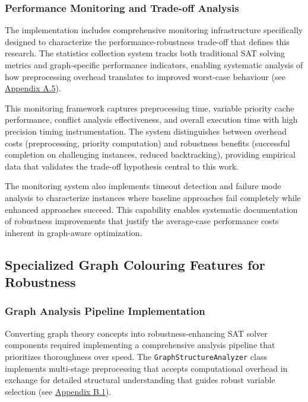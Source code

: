 \subsubsection{Performance Monitoring and Trade-off Analysis}

The implementation includes comprehensive monitoring infrastructure specifically designed to characterize the performance-robustness trade-off that defines this research. The statistics collection system tracks both traditional SAT solving metrics and graph-specific performance indicators, enabling systematic analysis of how preprocessing overhead translates to improved worst-case behaviour (see \hyperref[appendix:performance-monitoring]{Appendix A.5}).

This monitoring framework captures preprocessing time, variable priority cache performance, conflict analysis effectiveness, and overall execution time with high precision timing instrumentation. The system distinguishes between overhead costs (preprocessing, priority computation) and robustness benefits (successful completion on challenging instances, reduced backtracking), providing empirical data that validates the trade-off hypothesis central to this work.

The monitoring system also implements timeout detection and failure mode analysis to characterize instances where baseline approaches fail completely while enhanced approaches succeed. This capability enables systematic documentation of robustness improvements that justify the average-case performance costs inherent in graph-aware optimization.

\subsection{Specialized Graph Colouring Features for Robustness}

\subsubsection{Graph Analysis Pipeline Implementation}

Converting graph theory concepts into robustness-enhancing SAT solver components required implementing a comprehensive analysis pipeline that prioritizes thoroughness over speed. The \texttt{GraphStructureAnalyzer} class implements multi-stage preprocessing that accepts computational overhead in exchange for detailed structural understanding that guides robust variable selection (see \hyperref[appendix:graph-structure]{Appendix B.1}).

